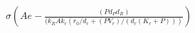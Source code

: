 \documentclass{article}
\begin{document}
\begin{align}
\sigma (Ae - \frac{(P d_P d_R)}{(k_RA k_r (r_0/d_r + (P V_r)/(d_r (K_r + P)))})
\end{align}
\end{document}
